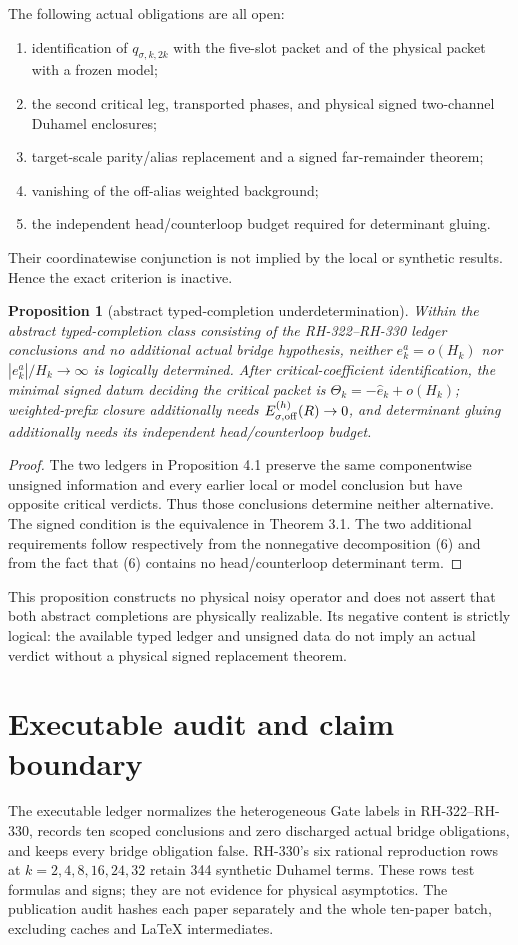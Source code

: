 \documentclass[11pt]{article}
\newtheorem{proposition}[theorem]{Proposition}
\theoremstyle{remark}\newtheorem{remark}[theorem]{Remark}
\newcommand{\Hk}{H_k}
\begin{document}
The following actual obligations are all open:
\begin{enumerate}
\item identification of $q_{\sigma,k,2k}$ with the five-slot packet and of
      the physical packet with a frozen model;
\item the second critical leg, transported phases, and physical signed
      two-channel Duhamel enclosures;
\item target-scale parity/alias replacement and a signed far-remainder
      theorem;
\item vanishing of the off-alias weighted background;
\item the independent head/counterloop budget required for determinant
      gluing.
\end{enumerate}
Their coordinatewise conjunction is not implied by the local or synthetic
results.  Hence the exact criterion is inactive.

\begin{proposition}[abstract typed-completion underdetermination]
Within the abstract typed-completion class consisting of the
RH-322--RH-330 ledger conclusions and no additional actual bridge
hypothesis, neither
$e_k^a=o(\Hk)$ nor $|e_k^a|/\Hk\to\infty$ is logically determined.  After
critical-coefficient identification, the minimal signed datum deciding the
critical packet is
$\Theta_k=-\widehat e_k+o(\Hk)$; weighted-prefix closure additionally needs
$E_{\sigma,\rm off}^{(h)}(R)\to0$, and determinant gluing additionally needs
its independent head/counterloop budget.
\end{proposition}
\begin{proof}
The two ledgers in Proposition 4.1 preserve the same componentwise unsigned
information and every earlier local or model conclusion but have opposite
critical verdicts.  Thus those conclusions determine neither alternative.
The signed condition is the equivalence in Theorem 3.1.  The two additional
requirements follow respectively from the nonnegative decomposition (6) and
from the fact that (6) contains no head/counterloop determinant term.
\end{proof}

This proposition constructs no physical noisy operator and does not assert
that both abstract completions are physically realizable.  Its negative
content is strictly logical: the available typed ledger and unsigned data do
not imply an actual verdict without a physical signed replacement theorem.

\section{Executable audit and claim boundary}
The executable ledger normalizes the heterogeneous Gate labels in
RH-322--RH-330, records ten scoped conclusions and zero discharged actual
bridge obligations, and keeps every bridge obligation false.  RH-330's six rational
reproduction rows at $k=2,4,8,16,24,32$ retain 344 synthetic Duhamel terms.
These rows test formulas and signs; they are not evidence for physical
asymptotics.  The publication audit hashes each paper separately and the
whole ten-paper batch, excluding caches and \LaTeX{} intermediates.
\end{document}

